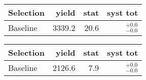 \begin{tabular}{l|rrr}
\toprule
   Selection & yield & stat & syst tot   \\ 
\midrule
    Baseline & 3339.2 & 20.6 & ${}^{+0.0}_{-0.0}$ \\
\bottomrule
\end{tabular}



\begin{tabular}{l|rrr}
\toprule
   Selection & yield & stat & syst tot   \\ 
\midrule
    Baseline & 2126.6 & 7.9 & ${}^{+0.0}_{-0.0}$ \\
\bottomrule
\end{tabular}
